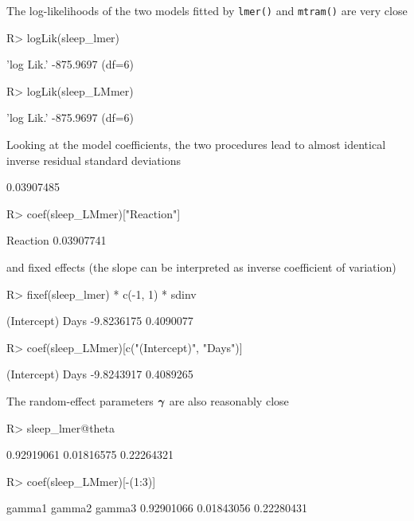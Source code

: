 \documentclass[article,nojss,shortnames]{jss}\usepackage[]{graphicx}\usepackage[]{xcolor}
\newcommand{\cmd}[1]{\texttt{#1()}}
\newcommand{\varparm}{\gammavec}
\def \gammavec        {\text{\boldmath$\gamma$}}
\begin{document}
The log-likelihoods of the two models fitted by \cmd{lmer} and \cmd{mtram} 
are very close
\begin{Schunk}
\begin{Sinput}
R> logLik(sleep_lmer)
\end{Sinput}
\begin{Soutput}
'log Lik.' -875.9697 (df=6)
\end{Soutput}
\begin{Sinput}
R> logLik(sleep_LMmer)
\end{Sinput}
\begin{Soutput}
'log Lik.' -875.9697 (df=6)
\end{Soutput}
\end{Schunk}
Looking at the model coefficients, the two procedures lead to almost
identical inverse residual standard deviations
\begin{Schunk}
\begin{Soutput}
[1] 0.03907485
\end{Soutput}
\begin{Sinput}
R> coef(sleep_LMmer)["Reaction"]
\end{Sinput}
\begin{Soutput}
  Reaction 
0.03907741 
\end{Soutput}
\end{Schunk}
and fixed effects (the slope can be interpreted as inverse coefficient of
variation)
\begin{Schunk}
\begin{Sinput}
R> fixef(sleep_lmer) * c(-1, 1) * sdinv
\end{Sinput}
\begin{Soutput}
(Intercept)        Days 
 -9.8236175   0.4090077 
\end{Soutput}
\begin{Sinput}
R> coef(sleep_LMmer)[c("(Intercept)", "Days")]
\end{Sinput}
\begin{Soutput}
(Intercept)        Days 
 -9.8243917   0.4089265 
\end{Soutput}
\end{Schunk}
The random-effect parameters $\varparm$ are also reasonably close
\begin{Schunk}
\begin{Sinput}
R> sleep_lmer@theta
\end{Sinput}
\begin{Soutput}
[1] 0.92919061 0.01816575 0.22264321
\end{Soutput}
\begin{Sinput}
R> coef(sleep_LMmer)[-(1:3)]
\end{Sinput}
\begin{Soutput}
    gamma1     gamma2     gamma3 
0.92901066 0.01843056 0.22280431 
\end{Soutput}
\end{Schunk}
\end{document}
